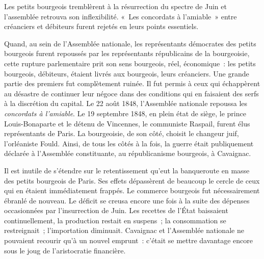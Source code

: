 \documentclass[twoside]{book} %
\begin{document}
Les petits bourgeois tremblèrent à la résurrection du spectre de Juin et l’assemblée retrouva son inflexibilité. « Les concordats à l’amiable » entre créanciers et débiteurs furent rejetés en leurs points essentiels.\par
Quand, au sein de l’Assemblée nationale, les représentants démocrates des petits bourgeois furent repoussés par les représentants républicains de la bourgeoisie, cette rupture parlementaire prit son sens bourgeois, réel, économique : les petits bourgeois, débiteurs, étaient livrés aux bourgeois, leurs créanciers. Une grande partie des premiers fut complètement ruinée. Il fut permis à ceux qui échappèrent au désastre de continuer leur négoce dans des conditions qui en faisaient des serfs à la discrétion du capital. Le 22 août 1848, l’Assemblée nationale repoussa les \emph{concordats à l’amiable}. Le 19 septembre 1848, en plein état de siège, le prince Louis-Bonaparte et le détenu de Vincennes, le communiste Raspail, furent élus représentants de Paris. La bourgeoisie, de son côté, choisit le changeur juif, l’orléaniste Fould. Ainsi, de tous les côtés à la fois, la guerre était publiquement déclarée à l’Assemblée constituante, au républicanisme bourgeois, à Cavaignac.\par
Il est inutile de s’étendre sur le retentissement qu’eut la banqueroute en masse des petits bourgeois de Paris. Ses effets dépassèrent de beaucoup le cercle de ceux qui en étaient immédiatement frappés. Le commerce bourgeois fut nécessairement ébranlé de nouveau. Le déficit se creusa encore une fois à la suite des dépenses occasionnées par l’insurrection de Juin. Les recettes de l’État baissaient continuellement, la production restait en suspens ; la consommation se restreignait ; l’importation diminuait. Cavaignac et l’Assemblée nationale ne pouvaient recourir qu’à un nouvel emprunt : c’était se mettre davantage encore sous le joug de l’aristocratie financière.\par
\end{document}
